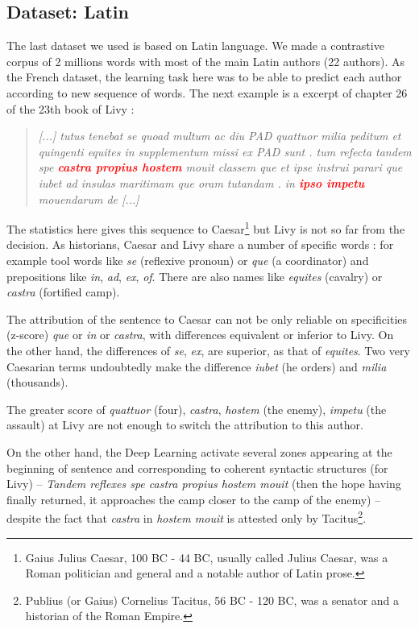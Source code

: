 \subsection{Dataset: Latin}

The last dataset we used is based on Latin language. We made a contrastive corpus of 2 millions words with most of the main Latin authors (22 authors). As the French dataset, the learning task here was to be able to predict each author according to new sequence of words. The next example is a excerpt of chapter 26 of the 23th book of Livy :

\begin{quote}
\textit{[...] tutus tenebat se quoad multum ac diu PAD quattuor milia peditum et quingenti equites in supplementum missi ex PAD sunt . tum refecta tandem spe \textcolor{red}{\textbf{castra propius hostem}} mouit classem que et ipse instrui parari que iubet ad insulas maritimam que oram tutandam . in \textcolor{red}{\textbf{ipso impetu}} mouendarum de [...]} 
\end{quote}

The statistics here gives this sequence to Caesar\footnote{Gaius Julius Caesar, 100 BC - 44 BC, usually called Julius Caesar, was a Roman politician and general and a notable author of Latin prose.} but Livy is not so far from the decision. As historians, Caesar and Livy share a number of specific words : for example tool words like \textit{se} (reflexive pronoun) or \textit{que} (a coordinator) and prepositions like \textit{in}, \textit{ad}, \textit{ex}, \textit{of}. There are also names like \textit{equites} (cavalry) or \textit{castra} (fortified camp).

The attribution of the sentence to Caesar can not be only reliable on specificities (z-score) \textit{que} or \textit{in} or \textit{castra}, with differences equivalent or inferior to Livy. On the other hand, the differences of \textit{se}, \textit{ex}, are superior, as that of \textit{equites}. Two very Caesarian terms undoubtedly make the difference \textit{iubet} (he orders) and \textit{milia} (thousands).

The greater score of \textit{quattuor} (four), \textit{castra}, \textit{hostem} (the enemy), \textit{impetu} (the assault) at Livy are not enough to switch the attribution to this author.

On the other hand, the Deep Learning activate several zones appearing at the beginning of sentence and corresponding to coherent syntactic structures (for Livy) -- \textit{Tandem reflexes spe castra propius hostem mouit} (then the hope having finally returned, it approaches the camp closer to the camp of the enemy) -- despite the fact that \textit{castra} in \textit{hostem mouit} is attested only by Tacitus\footnote{Publius (or Gaius) Cornelius Tacitus, 56 BC - 120 BC, was a senator and a historian of the Roman Empire.}. 

